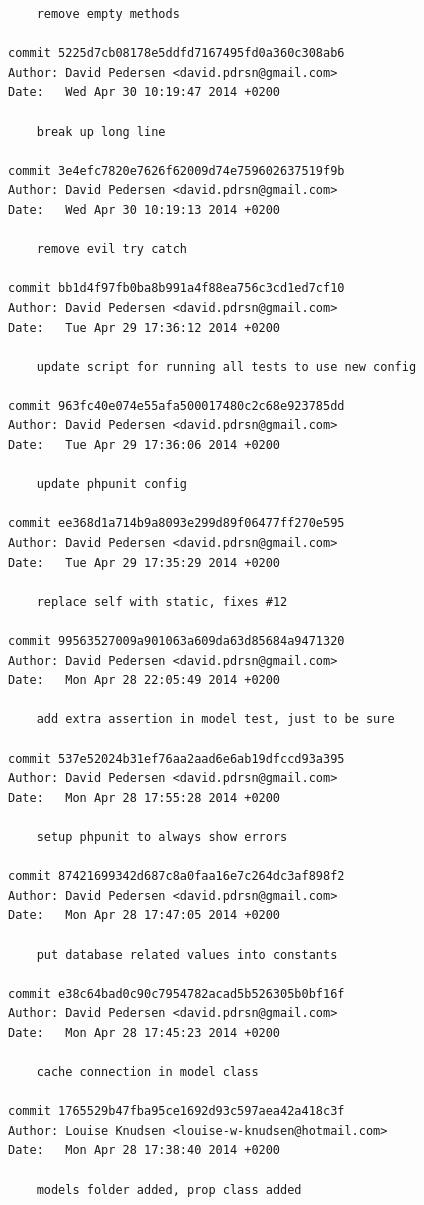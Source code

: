 \documentclass[12pt]{article}
\begin{document}
\begin{verbatim}
    remove empty methods

commit 5225d7cb08178e5ddfd7167495fd0a360c308ab6
Author: David Pedersen <david.pdrsn@gmail.com>
Date:   Wed Apr 30 10:19:47 2014 +0200

    break up long line

commit 3e4efc7820e7626f62009d74e759602637519f9b
Author: David Pedersen <david.pdrsn@gmail.com>
Date:   Wed Apr 30 10:19:13 2014 +0200

    remove evil try catch

commit bb1d4f97fb0ba8b991a4f88ea756c3cd1ed7cf10
Author: David Pedersen <david.pdrsn@gmail.com>
Date:   Tue Apr 29 17:36:12 2014 +0200

    update script for running all tests to use new config

commit 963fc40e074e55afa500017480c2c68e923785dd
Author: David Pedersen <david.pdrsn@gmail.com>
Date:   Tue Apr 29 17:36:06 2014 +0200

    update phpunit config

commit ee368d1a714b9a8093e299d89f06477ff270e595
Author: David Pedersen <david.pdrsn@gmail.com>
Date:   Tue Apr 29 17:35:29 2014 +0200

    replace self with static, fixes #12

commit 99563527009a901063a609da63d85684a9471320
Author: David Pedersen <david.pdrsn@gmail.com>
Date:   Mon Apr 28 22:05:49 2014 +0200

    add extra assertion in model test, just to be sure

commit 537e52024b31ef76aa2aad6e6ab19dfccd93a395
Author: David Pedersen <david.pdrsn@gmail.com>
Date:   Mon Apr 28 17:55:28 2014 +0200

    setup phpunit to always show errors

commit 87421699342d687c8a0faa16e7c264dc3af898f2
Author: David Pedersen <david.pdrsn@gmail.com>
Date:   Mon Apr 28 17:47:05 2014 +0200

    put database related values into constants

commit e38c64bad0c90c7954782acad5b526305b0bf16f
Author: David Pedersen <david.pdrsn@gmail.com>
Date:   Mon Apr 28 17:45:23 2014 +0200

    cache connection in model class

commit 1765529b47fba95ce1692d93c597aea42a418c3f
Author: Louise Knudsen <louise-w-knudsen@hotmail.com>
Date:   Mon Apr 28 17:38:40 2014 +0200

    models folder added, prop class added


\end{verbatim}
\end{document}
